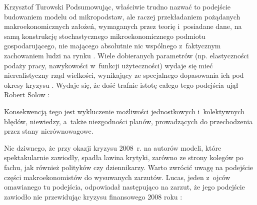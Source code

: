 \begin{artplenv}{Krzysztof Turowski}
Podsumowując, właściwie trudno nazwać to podejście budowaniem modelu od mikropodstaw, ale raczej przekładaniem
pożądanych makroekonomicznych założeń, wymaganych przez teorię i~posiadane dane, na samą konstrukcję stochastycznego
mikroekonomicznego podmiotu gospodarującego, nie mającego absolutnie nic wspólnego z~faktycznym zachowaniem ludzi na rynku
\parencite{machaj_money_2017}.
Wiele dobieranych parametrów (np. elastyczności podaży pracy,
nawykowości w~funkcji użyteczności) wydaje się mieć nierealistyczny rząd wielkości, wynikający ze specjalnego dopasowania ich pod
okresy kryzysu
\parencite{korinek_thoughts_2017}.
Wydaje się, że dość trafnie istotę całego tego podejścia ujął
Robert Solow
\parencite[s.~241]{solow_state_2008}:


Konsekwencją tego jest wykluczenie możliwości jednostkowych i~kolektywnych błędów, niewiedzy, a~także niezgodności
planów, prowadzących do przechodzenia przez stany nierównowagowe.

Nic dziwnego, że przy okazji kryzysu 2008~r. na autorów modeli, które spektakularnie zawiodły, spadła lawina krytyki,
zarówno ze strony kolegów po fachu, jak również polityków czy dziennikarzy. Warto zwrócić uwagę na podejście części
makroekonomistów do wysuwanych zarzutów. Lucas, jeden z~ojców omawianego tu podejścia, odpowiadał następująco na
zarzut, że jego podejście zawiodło nie przewidując kryzysu finansowego 2008 roku
\parencite{lucas_defence_2009}:


\end{artplenv}
